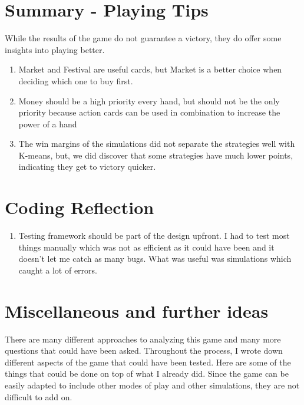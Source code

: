 \documentclass[11pt, oneside]{article}   	%
\begin{document}
\section{Summary - Playing Tips}

While the results of the game do not guarantee a victory, they do offer some insights into playing better. 

	\begin{enumerate}
 		 \item Market and Festival are useful cards, but Market is a better choice when deciding which one to buy first. 
		 \item Money should be a high priority every hand, but should not be the only priority because action cards can be used in combination to increase the power of a hand
		 \item The win margins of the simulations did not separate the strategies well with K-means, but, we did discover that some strategies have much lower points, indicating they get to victory quicker. 
	\end{enumerate}

\section{Coding Reflection}

	\begin{enumerate}
 		 \item Testing framework should be part of the design upfront. I had to test most things manually which was not as efficient as it could have been and it doesn't let me catch as many bugs. What was useful was simulations which caught a lot of errors. 
	\end{enumerate}



\section{Miscellaneous and further ideas}

There are many different approaches to analyzing this game and many more questions that could have been asked. Throughout the process, I wrote down different aspects of the game that could have been tested. Here are some of the things that could be done on top of what I already did. Since the game can be easily adapted to include other modes of play and other simulations, they are not difficult to add on. \\
\end{document}
